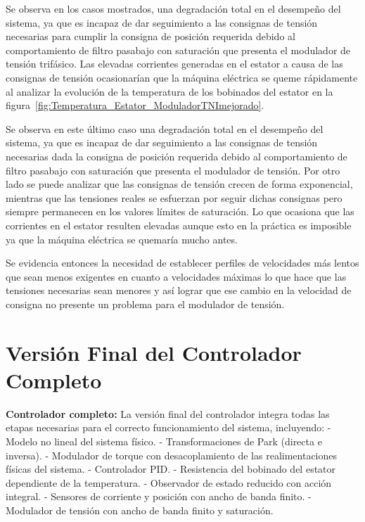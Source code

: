 \documentclass{article}
\begin{document}
Se observa en los casos mostrados, una degradación total en el desempeño del sistema, ya que es incapaz de dar seguimiento a las consignas de tensión necesarias para cumplir la consigna de posición requerida debido al comportamiento de filtro pasabajo con saturación que presenta el modulador de tensión trifásico. Las elevadas corrientes generadas en el estator a causa de las consignas de tensión ocasionarían que la máquina eléctrica se queme rápidamente al analizar la evolución de la temperatura de los bobinados del estator en la figura~\ref{fig:Temperatura_Estator_ModuladorTNImejorado}.

Se observa en este \'ultimo caso una degradaci\'on total en el desempe\~no del sistema, ya que es incapaz de dar seguimiento a las consignas de tensi\'on necesarias dada la consigna de posici\'on requerida debido al comportamiento de filtro pasabajo con saturaci\'on que presenta el modulador de tensi\'on. Por otro lado se puede analizar que las consignas de tensi\'on crecen de forma exponencial, mientras que las tensiones reales se esfuerzan por seguir dichas consignas pero siempre permanecen en los valores l\'imites de saturaci\'on. Lo que ocasiona que las corrientes en el estator resulten elevadas aunque esto en la pr\'actica es imposible ya que la m\'aquina el\'ectrica se quemar\'ia mucho antes.

Se evidencia entonces la necesidad de establecer perfiles de velocidades m\'as lentos que sean menos exigentes en cuanto a velocidades m\'aximas lo que hace que las tensiones necesarias sean menores y as\'i lograr que ese cambio en la velocidad de consigna no presente un problema para el modulador de tensi\'on.


\section{Versión Final del Controlador Completo}

\textbf{Controlador completo:} 
La versión final del controlador integra todas las etapas necesarias para el correcto funcionamiento del sistema, incluyendo:
- Modelo no lineal del sistema físico.
- Transformaciones de Park (directa e inversa).
- Modulador de torque con desacoplamiento de las realimentaciones físicas del sistema.
- Controlador PID.
- Resistencia del bobinado del estator dependiente de la temperatura.
- Observador de estado reducido con acción integral.
- Sensores de corriente y posición con ancho de banda finito.
- Modulador de tensión con ancho de banda finito y saturación.
\end{document}
